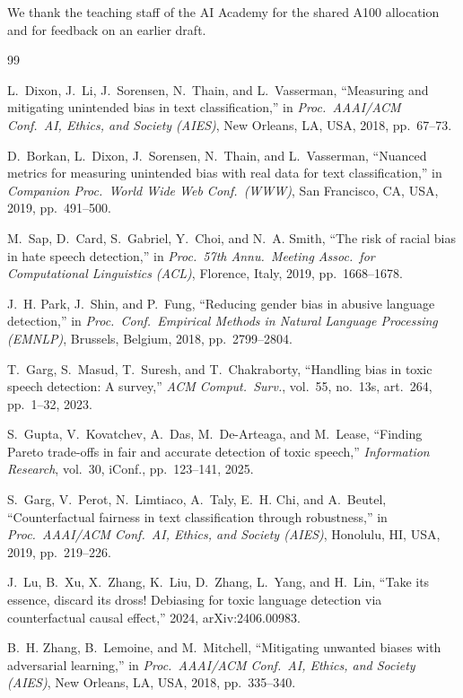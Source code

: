 \documentclass[conference]{IEEEtran}
\begin{document}
We thank the teaching staff of the AI Academy for the shared A100 allocation and
for feedback on an earlier draft.

\balance
\begin{thebibliography}{99}

L.~Dixon, J.~Li, J.~Sorensen, N.~Thain, and L.~Vasserman, ``Measuring and
mitigating unintended bias in text classification,'' in \emph{Proc.\ AAAI/ACM
Conf.\ AI, Ethics, and Society (AIES)}, New Orleans, LA, USA, 2018, pp.\ 67--73.

D.~Borkan, L.~Dixon, J.~Sorensen, N.~Thain, and L.~Vasserman, ``Nuanced metrics
for measuring unintended bias with real data for text classification,'' in
\emph{Companion Proc.\ World Wide Web Conf.\ (WWW)}, San Francisco, CA, USA,
2019, pp.\ 491--500.

M.~Sap, D.~Card, S.~Gabriel, Y.~Choi, and N.~A. Smith, ``The risk of racial bias
in hate speech detection,'' in \emph{Proc.\ 57th Annu.\ Meeting Assoc.\ for
Computational Linguistics (ACL)}, Florence, Italy, 2019, pp.\ 1668--1678.

J.~H. Park, J.~Shin, and P.~Fung, ``Reducing gender bias in abusive language
detection,'' in \emph{Proc.\ Conf.\ Empirical Methods in Natural Language
Processing (EMNLP)}, Brussels, Belgium, 2018, pp.\ 2799--2804.

T.~Garg, S.~Masud, T.~Suresh, and T.~Chakraborty, ``Handling bias in toxic speech
detection: A survey,'' \emph{ACM Comput.\ Surv.}, vol.\ 55, no.\ 13s, art.\ 264,
pp.\ 1--32, 2023.

S.~Gupta, V.~Kovatchev, A.~Das, M.~De-Arteaga, and M.~Lease, ``Finding Pareto
trade-offs in fair and accurate detection of toxic speech,'' \emph{Information
Research}, vol.\ 30, iConf., pp.\ 123--141, 2025.

S.~Garg, V.~Perot, N.~Limtiaco, A.~Taly, E.~H. Chi, and A.~Beutel,
``Counterfactual fairness in text classification through robustness,'' in
\emph{Proc.\ AAAI/ACM Conf.\ AI, Ethics, and Society (AIES)}, Honolulu, HI, USA,
2019, pp.\ 219--226.

J.~Lu, B.~Xu, X.~Zhang, K.~Liu, D.~Zhang, L.~Yang, and H.~Lin, ``Take its
essence, discard its dross! Debiasing for toxic language detection via
counterfactual causal effect,'' 2024, arXiv:2406.00983.

B.~H. Zhang, B.~Lemoine, and M.~Mitchell, ``Mitigating unwanted biases with
adversarial learning,'' in \emph{Proc.\ AAAI/ACM Conf.\ AI, Ethics, and Society
(AIES)}, New Orleans, LA, USA, 2018, pp.\ 335--340.


\end{thebibliography}
\end{document}
